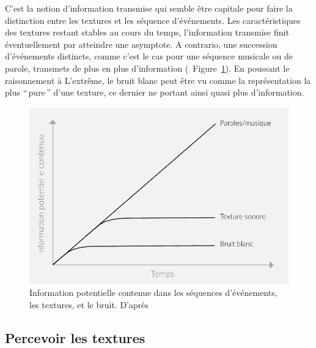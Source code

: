C'est la notion d'information transmise qui semble être capitale pour faire la distinction entre les textures et les séquence d'événements. Les caractéristiques des textures restant stables au cours du temps, l'information transmise finit éventuellement par atteindre une asymptote. A contrario, une succession d'événements distincts, comme c'est le cas pour une séquence musicale ou de parole, transmets de plus en plus d'information (\Cf~Figure~\ref{fig:texture}). En poussant le raisonnement à L’extrême, le bruit blanc peut être vu comme la représentation la plus ``\,pure\,'' d'une texture, ce dernier ne portant ainsi quasi plus d'information.

\begin{figure}[bth]
        \myfloatalign
        \includegraphics[width=\linewidth]{gfx/texture}
        \caption[Information potentielle contenue dans les séquences d'événements, les textures, et le bruit]{Information potentielle contenue dans les séquences d'événements, les textures, et le bruit. D'après \citep{saint1995classification}}\label{fig:texture}
\end{figure}

\subsection{Percevoir les textures}

